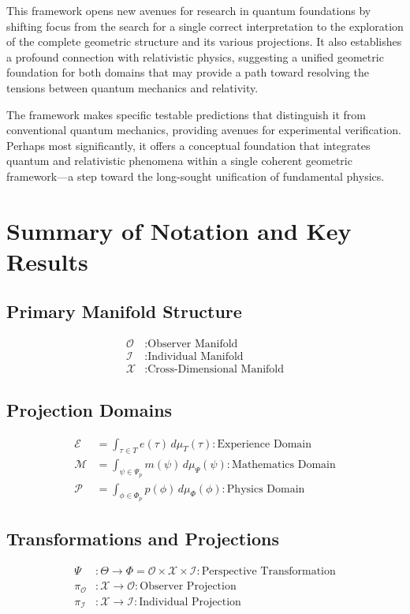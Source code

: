 \documentclass{article}
\begin{document}
This framework opens new avenues for research in quantum foundations by shifting focus from the search for a single correct interpretation to the exploration of the complete geometric structure and its various projections. It also establishes a profound connection with relativistic physics, suggesting a unified geometric foundation for both domains that may provide a path toward resolving the tensions between quantum mechanics and relativity.

The framework makes specific testable predictions that distinguish it from conventional quantum mechanics, providing avenues for experimental verification. Perhaps most significantly, it offers a conceptual foundation that integrates quantum and relativistic phenomena within a single coherent geometric framework—a step toward the long-sought unification of fundamental physics.

\section{Summary of Notation and Key Results}

\subsection{Primary Manifold Structure}
\begin{align}
\mathcal{O} &: \text{Observer Manifold} \\
\mathcal{I} &: \text{Individual Manifold} \\
\mathcal{X} &: \text{Cross-Dimensional Manifold}
\end{align}

\subsection{Projection Domains}
\begin{align}
\mathcal{E} &= \int_{\tau \in T} e(\tau) \, d\mu_T(\tau) : \text{Experience Domain} \\
\mathcal{M} &= \int_{\psi \in \Psi_p} m(\psi) \, d\mu_\Psi(\psi) : \text{Mathematics Domain} \\
\mathcal{P} &= \int_{\phi \in \Phi_p} p(\phi) \, d\mu_\Phi(\phi) : \text{Physics Domain}
\end{align}

\subsection{Transformations and Projections}
\begin{align}
\Psi &: \Theta \to \Phi = \mathcal{O} \times \mathcal{X} \times \mathcal{I} : \text{Perspective Transformation} \\
\pi_{\mathcal{O}} &: \mathcal{X} \to \mathcal{O} : \text{Observer Projection} \\
\pi_{\mathcal{I}} &: \mathcal{X} \to \mathcal{I} : \text{Individual Projection}
\end{align}
\end{document}
